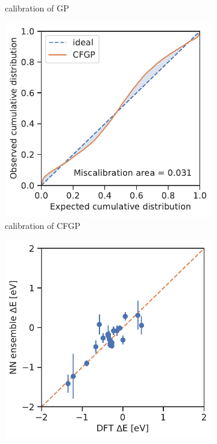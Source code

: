 \documentclass[]{achemso}
\begin{document}
\begin{figure}
\begin{subfigure}[b]{0.32\textwidth}
        \caption{calibration of \gls{GP}}\label{fig:calibration_example_gp}
    \end{subfigure}
    \begin{subfigure}[b]{0.32\textwidth}
        \includegraphics[width=\textwidth]{../CFGP/Matern/calibration.pdf}
        \caption{calibration of \gls{CFGP}}\label{fig:calibration_example_cfgp}
    \end{subfigure}
    \begin{subfigure}[b]{0.32\textwidth}
        \includegraphics[width=\textwidth]{../NN_ensemble/error_bar_parity.pdf}

\end{subfigure}
\end{figure}
\end{document}
